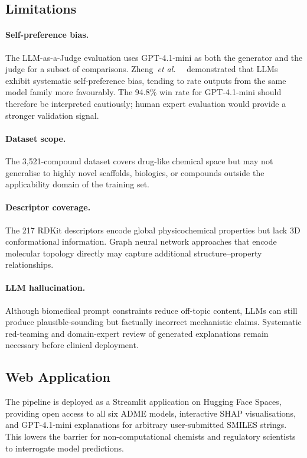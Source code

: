 \documentclass[a4paper, 11pt]{article}
\newcommand{\etal}{\textit{et al.}\ }
\begin{document}
\subsection{Limitations}

\paragraph{Self-preference bias.}
The LLM-as-a-Judge evaluation uses GPT-4.1-mini as both the generator and
the judge for a subset of comparisons. Zheng~\etal~\cite{zheng2023judging}
demonstrated that LLMs exhibit systematic self-preference bias, tending to
rate outputs from the same model family more favourably. The 94.8\% win
rate for GPT-4.1-mini should therefore be interpreted cautiously; human
expert evaluation would provide a stronger validation signal.

\paragraph{Dataset scope.}
The 3{,}521-compound dataset covers drug-like chemical space but may not
generalise to highly novel scaffolds, biologics, or compounds outside the
applicability domain of the training set.

\paragraph{Descriptor coverage.}
The 217 RDKit descriptors encode global physicochemical properties but
lack 3D conformational information. Graph neural network approaches that
encode molecular topology directly may capture additional structure–property
relationships.

\paragraph{LLM hallucination.}
Although biomedical prompt constraints reduce off-topic content, LLMs can
still produce plausible-sounding but factually incorrect mechanistic claims.
Systematic red-teaming and domain-expert review of generated explanations
remain necessary before clinical deployment.

\subsection{Web Application}

The pipeline is deployed as a Streamlit application on Hugging Face Spaces,
providing open access to all six ADME models, interactive SHAP
visualisations, and GPT-4.1-mini explanations for arbitrary user-submitted
SMILES strings. This lowers the barrier for non-computational chemists and
regulatory scientists to interrogate model predictions.
\end{document}
